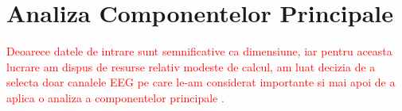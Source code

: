 \section{Analiza Componentelor Principale}

\quad \textcolor{red}{	
Deoarece datele de intrare sunt semnificative ca dimensiune, iar pentru aceasta
lucrare am dispus de resurse relativ modeste de calcul, am luat decizia de a 
selecta doar canalele EEG pe care le-am considerat importante si mai apoi
de a aplica o analiza a componentelor principale . }